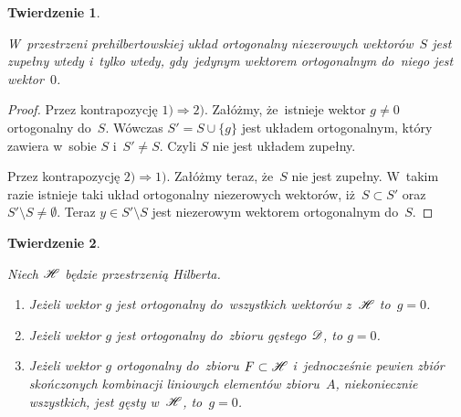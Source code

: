 \documentclass[a4paper,11pt]{article}
\newtheorem{theorem}{Twierdzenie} %
\begin{document}
\begin{theorem}
  \label{thm:UkladZupelny}

  W~przestrzeni prehilbertowskiej układ ortogonalny niezerowych
  wektorów~$S$ jest zupełny wtedy i~tylko wtedy, gdy~jedynym wektorem
  ortogonalnym do~niego jest wektor~$0$.

\end{theorem}



\begin{proof}

  Przez kontrapozycję $1) \Rightarrow 2)$. Załóżmy, że~istnieje wektor
  $g \neq 0$ ortogonalny do~$S$. Wówczas $S' = S \cup \{ g \}$ jest
  układem ortogonalnym, który zawiera w~sobie $S$ i~$S' \neq S$. Czyli
  $S$ nie jest układem zupełny.

  Przez kontrapozycję $2) \Rightarrow 1)$. Załóżmy teraz, że~$S$ nie jest
  zupełny. W~takim razie istnieje taki układ ortogonalny niezerowych
  wektorów, iż~$S \subset S'$ oraz $S' \setminus S \neq \emptyset$. Teraz
  $y \in S' \setminus S$ jest niezerowym wektorem ortogonalnym do~$S$.

\end{proof}





\begin{theorem}
  \label{thm:OrotgonalnoscDoZbioruGestegoIBazy}

  Niech $\mathcal{H}$ będzie przestrzenią Hilberta.
  \begin{enumerate}
  \item Jeżeli wektor $g$ jest ortogonalny do~wszystkich wektorów
    z~$\mathcal{H}$ to~$g = 0$.

  \item Jeżeli wektor $g$ jest ortogonalny do~zbioru gęstego $\mathcal{D}$, to
    $g = 0$.

  \item Jeżeli wektor $g$ ortogonalny do~zbioru $F \subset \mathcal{H}$
    i~jednocześnie pewien zbiór skończonych kombinacji liniowych
    elementów zbioru~$A$, niekoniecznie wszystkich, jest gęsty
    w~$\mathcal{H}$, to~$g = 0$.

  \end{enumerate}

\end{theorem}
\end{document}
